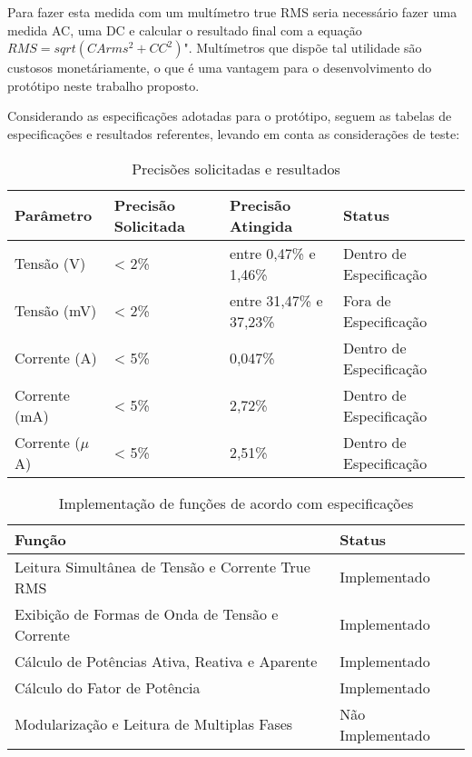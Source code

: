 Para fazer esta medida com um multímetro true RMS seria necessário fazer uma medida AC, uma DC e calcular o resultado final com a equação $RMS=sqrt(CArms^2+CC^2)$". Multímetros que dispõe tal utilidade são custosos monetáriamente, o que é uma vantagem para o desenvolvimento do protótipo neste trabalho proposto. 

Considerando as especificações adotadas para o protótipo, seguem as tabelas de especificações e resultados referentes, levando em conta as considerações de teste:

\begin{table}[!ht]
    \centering
    \caption{Precisões solicitadas e resultados}
    \label{tab:resultados-precis}
    \begin{tabular}{|l|l|l|l|}
        \hline
        \textbf{Parâmetro} & \textbf{Precisão Solicitada} & \textbf{Precisão Atingida} & \textbf{Status}         \\ \hline
        Tensão (V)         & < 2\%                        & entre 0,47\% e 1,46\%      & Dentro de Especificação \\ \hline
        Tensão (mV)        & < 2\%                        & entre 31,47\% e 37,23\%    & Fora de Especificação   \\ \hline
        Corrente (A)       & < 5\%                        & 0,047\%                    & Dentro de Especificação \\ \hline
        Corrente (mA)      & < 5\%                        & 2,72\%                     & Dentro de Especificação  \\ \hline
        Corrente ($\mu$A)  & < 5\%                        & 2,51\%                     & Dentro de Especificação   \\ \hline
    \end{tabular}
\end{table}

\begin{table}[!ht]
    \centering
    \caption{Implementação de funções de acordo com especificações}
    \label{tab:resultados-func}
    \begin{tabular}{|l|l|}
        \hline
        \textbf{Função}                                  & \textbf{Status} \\ \hline
        Leitura Simultânea de Tensão e Corrente True RMS & Implementado  \\ \hline
        Exibição de Formas de Onda de Tensão e Corrente  & Implementado  \\ \hline
        Cálculo de Potências Ativa, Reativa e Aparente   & Implementado  \\ \hline
        Cálculo do Fator de Potência                     & Implementado  \\ \hline
        Modularização e Leitura de Multiplas Fases       & Não Implementado  \\ \hline
    \end{tabular}
\end{table}

